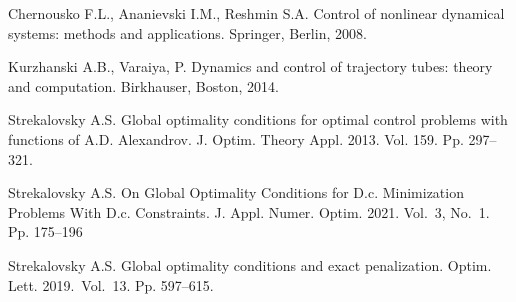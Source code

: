 \documentclass[12pt]{llncs}
\begin{document}
\begin{thebibliography}{9} %

	Chernousko F.L., Ananievski I.M., Reshmin S.A. Control of nonlinear dynamical systems: methods and applications. Springer, Berlin, 2008.
	
	Kurzhanski A.B., Varaiya, P. Dynamics and control of trajectory tubes: theory and computation. Birkhauser, Boston, 2014.
	
    Strekalovsky A.S. Global optimality conditions for optimal control problems with functions of A.D. Alexandrov. J. Optim. Theory Appl. 2013. Vol. 159. Pp. 297--321.
    
 Strekalovsky A.S. On Global Optimality Conditions for D.c. Minimization Problems With D.c. Constraints. J. Appl. Numer. Optim. 2021. Vol.~3, No.~1. Pp. 175--196

 Strekalovsky A.S. Global optimality conditions and exact penalization. Optim.	Lett.  2019.~Vol.~13. Pp. 597--615.
    
%
%
%
%
%

\end{thebibliography}

\end{document}
